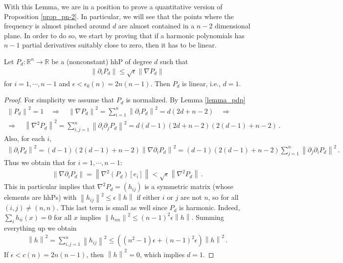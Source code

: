 \documentclass[11pt]{article}
\begin{document}
With this Lemma, we are in a position to prove a quantitative version of Proposition \ref{prop_pn-2}. In particular, we will see that the points where the frequency is almost pinched around $d$ are almost contained in a $n-2$ dimensional plane. In order to do so, we start by proving that if a harmonic polynomials has $n-1$ partial derivatives suitably close to zero, then it has to be linear.
\begin{lemma}
 Let $P_d:{\mathbb{R}}^n\to {\mathbb{R}}$ be a (nonconstant) hhP of degree $d$ such that
 \begin{gather}
  {\left\|{\partial_i P_d}\right\|}\leq \sqrt\epsilon {\left\|{\nabla P_d}\right\|}
 \end{gather}
for $i=1,\cdots,n-1$ and $\epsilon < \epsilon_0(n)=2n(n-1)$. Then $P_d$ is linear, i.e., $d=1$.
\end{lemma}
\begin{proof}
 For simplicity we assume that $P_d$ is normalized. By Lemma \ref{lemma_pdp}
 \begin{gather}
  {\left\|{P_d}\right\|}^2=1 \quad \Longrightarrow \quad {\left\|{\nabla P_d}\right\|}^2 =\sum_{i=1}^n {\left\|{\partial_i P_d}\right\|}^2 = d(2d+n-2) \quad \Longrightarrow \\
  \Longrightarrow \quad {\left\|{\nabla^2 P_d}\right\|}^2 =\sum_{i,j=1}^n {\left\|{\partial_i \partial_j P_d}\right\|}^2 = d(d-1)(2d+n-2)(2(d-1)+n-2)\, .
 \end{gather}
 Also, for each $i$,
 \begin{gather}
  {\left\|{\partial _i P_d }\right\|}^2 = (d-1)(2(d-1)+n-2) {\left\|{\nabla \partial_i P_d}\right\|}^2 = (d-1)(2(d-1)+n-2) \sum_{j=1}^n {\left\|{\partial_j \partial_i P_d}\right\|}^2\, .
 \end{gather}
 Thus we obtain that for $i=1,\cdots,n-1$:
 \begin{gather}
  {\left\|{\nabla \partial_i P_d}\right\|} = {\left\|{\nabla^2 (P_d)[e_i]}\right\|}<\sqrt \epsilon {\left\|{\nabla^2 P_d}\right\|}\, .
 \end{gather}
This in particular implies that $\nabla^2 P_d=(h_{ij})$ is a symmetric matrix (whose elements are hhPs) with ${\left\|{h_{ij}}\right\|}^2 \leq \epsilon{\left\|{h}\right\|}$ if either $i$ or $j$ are not $n$, so for all $(i,j)\neq (n,n)$. This last term is small as well since $P_d$ is harmonic. Indeed, $\sum_i h_{ii}(x) =0$ for all $x$ implies ${\left\|{h_{nn}}\right\|}^2 \leq (n-1)^2 \epsilon {\left\|h\right\|}$. Summing everything up we obtain
\begin{gather}
 {\left\|{h}\right\|}^2 = \sum_{i,j=1}^n {\left\|{h_{ij}}\right\|}^2 \leq {\left({(n^2-1)\epsilon + (n-1)^2 \epsilon }\right)} {\left\|{h}\right\|}^2\, .
\end{gather}
If $\epsilon < c(n) = 2n(n-1)$, then ${\left\|{h}\right\|}^2=0$, which implies $d=1$.
 
\end{proof}
\end{document}
